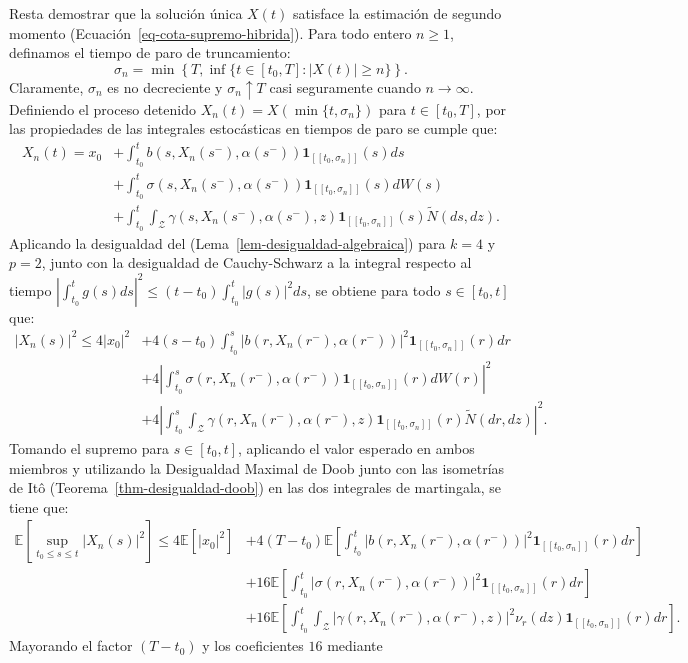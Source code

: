 \documentclass[
  spanish,
  us-letterpaper,
]{scrreprt}
\numberwithin{equation}{section}
\theoremstyle{plain}
\theoremstyle{plain}
\theoremstyle{definition}
\theoremstyle{plain}
\theoremstyle{remark}
\begin{document}
Resta demostrar que la solución única \(X(t)\) satisface la estimación
de segundo momento (Ecuación~\ref{eq-cota-supremo-hibrida}). Para todo
entero \(n \ge 1\), definamos el tiempo de paro de truncamiento: \[
\sigma_n = \min\left\{T, \inf\{t \in [t_0, T] : \vert X(t) \vert \ge n\}\right\}.
\] Claramente, \(\sigma_n\) es no decreciente y \(\sigma_n \uparrow T\)
casi seguramente cuando \(n \to \infty\). Definiendo el proceso detenido
\(X_n(t) = X(\min\{t, \sigma_n\})\) para \(t \in [t_0, T]\), por las
propiedades de las integrales estocásticas en tiempos de paro se cumple
que: \[
\begin{aligned}
X_n(t) = x_0 & + \int_{t_0}^t b(s, X_n(s^-), \alpha(s^-))\mathbf{1}_{[[t_0, \sigma_n]]}(s) ds \\
& + \int_{t_0}^t \sigma(s, X_n(s^-), \alpha(s^-))\mathbf{1}_{[[t_0, \sigma_n]]}(s) dW(s) \\
& + \int_{t_0}^t \int_{\mathcal{Z}} \gamma(s, X_n(s^-), \alpha(s^-), z)\mathbf{1}_{[[t_0, \sigma_n]]}(s) \tilde{N}(ds, dz).
\end{aligned}
\] Aplicando la desigualdad del (Lema~\ref{lem-desigualdad-algebraica})
para \(k = 4\) y \(p = 2\), junto con la desigualdad de Cauchy-Schwarz a
la integral respecto al tiempo
\(\displaystyle \left\vert \int_{t_0}^t g(s) ds \right\vert^2 \le (t - t_0)\int_{t_0}^t \vert g(s) \vert^2 ds\),
se obtiene para todo \(s \in [t_0, t]\) que: \[
\begin{aligned}
\vert X_n(s) \vert^2 \le 4\vert x_0 \vert^2 & + 4(s - t_0) \int_{t_0}^s \vert b(r, X_n(r^-), \alpha(r^-)) \vert^2 \mathbf{1}_{[[t_0, \sigma_n]]}(r) dr \\
& + 4\left\vert \int_{t_0}^s \sigma(r, X_n(r^-), \alpha(r^-))\mathbf{1}_{[[t_0, \sigma_n]]}(r) dW(r) \right\vert^2 \\
& + 4\left\vert \int_{t_0}^s \int_{\mathcal{Z}} \gamma(r, X_n(r^-), \alpha(r^-), z)\mathbf{1}_{[[t_0, \sigma_n]]}(r) \tilde{N}(dr, dz) \right\vert^2.
\end{aligned}
\] Tomando el supremo para \(s \in [t_0, t]\), aplicando el valor
esperado en ambos miembros y utilizando la Desigualdad Maximal de Doob
junto con las isometrías de Itô (Teorema~\ref{thm-desigualdad-doob}) en
las dos integrales de martingala, se tiene que: \[
\begin{aligned}
\mathbb{E}\left[ \sup_{t_0 \le s \le t} \vert X_n(s) \vert^2 \right] \le 4\mathbb{E}[\vert x_0 \vert^2] & + 4(T - t_0) \mathbb{E}\left[ \int_{t_0}^t \vert b(r, X_n(r^-), \alpha(r^-)) \vert^2 \mathbf{1}_{[[t_0, \sigma_n]]}(r) dr \right] \\
& + 16\mathbb{E}\left[ \int_{t_0}^t \vert \sigma(r, X_n(r^-), \alpha(r^-)) \vert^2 \mathbf{1}_{[[t_0, \sigma_n]]}(r) dr \right] \\
& + 16\mathbb{E}\left[ \int_{t_0}^t \int_{\mathcal{Z}} \vert \gamma(r, X_n(r^-), \alpha(r^-), z) \vert^2 \nu_r(dz) \mathbf{1}_{[[t_0, \sigma_n]]}(r) dr \right].
\end{aligned}
\] Mayorando el factor \((T - t_0)\) y los coeficientes \(16\) mediante
\end{document}
